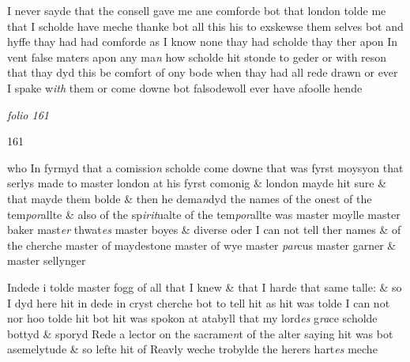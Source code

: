 \documentclass[12pt, a4paper]{book}
\begin{document}
		\ifthenelse{\isodd{\thepage}}
		{\reversemarginpar}
		{\normalmarginpar}
		I never sayde that the consell gave me ane comforde
 bot that london tolde me that I scholde have meche
 thanke bot
			 all this his to exskewse them selves bot and
			 hyffe
 thay had had comforde as I know none thay had scholde
 thay ther apon In vent false maters apon any ma\textit{n}
 how scholde hit stonde to geder or with reson 
			 that thay dyd this be
 comfort of ony bode when thay had all rede drawn
 or ever I spake w\textit{ith} them or come downe bot
			 falsodewoll ever
 have afoolle hende
            	

\dotfill
					

\textit{folio 161}


\begin{flushright}{\color{Mahogany}161}\end{flushright}
 	
 		
			
 		
		\ifthenelse{\isodd{\thepage}}
		{\reversemarginpar}
		{\normalmarginpar}
		who In fyrmyd that a comissio\textit{n} scholde come downe that
 was fyrst moysyon that serlys made to master london
 			at his fyrst comonig \& london mayde hit sure \& that
 mayde them bolde \& then he dema\textit{n}dyd the names
 of the onest of the tem\textit{por}allte \& also of the sp\textit{irit}ualte
 			of the tem\textit{por}allte was master moylle master baker
 			mast\textit{er} thwat\textit{es} master boyes \& diverse oder I can
 not tell ther names \& of the cherche master of
 	maydestone master of wye master \textit{par}cus master
 garner \& master sellynger

	
				\marginpar[\vspace{0.5cm}{\textcolor{Gray}{i0.}}]{}
			
	
		\ifthenelse{\isodd{\thepage}}
		{\reversemarginpar}
		{\normalmarginpar}
		Indede i tolde master fogg of all that I knew \& that I
 harde that same talle: \& so I dyd here hit in dede in
 cryst cherche bot to tell hit as hit was tolde I can not
 nor hoo tolde hit bot hit was spokon at atabyll
 that my lord\textit{es} g\textit{ra}ce scholde bottyd \& sporyd Rede a
 lector on the sacrame\textit{n}t of the alter saying
 hit was bot asemelytude \& so lefte hit of Reavly
 weche trobylde the herers hart\textit{es} meche
\end{document}
